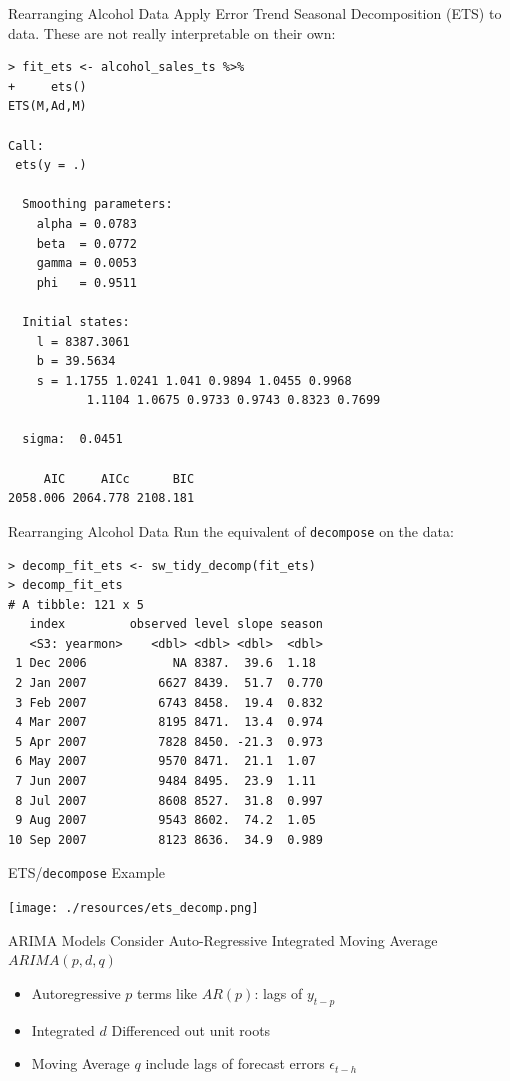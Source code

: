 \begin{frame}[fragile]{Rearranging Alcohol Data}
Apply \alert{Error Trend Seasonal} Decomposition (ETS) to data. These are not really interpretable on their own:
\tiny
\begin{verbatim}
> fit_ets <- alcohol_sales_ts %>%
+     ets()
ETS(M,Ad,M) 

Call:
 ets(y = .) 

  Smoothing parameters:
    alpha = 0.0783 
    beta  = 0.0772 
    gamma = 0.0053 
    phi   = 0.9511 

  Initial states:
    l = 8387.3061 
    b = 39.5634 
    s = 1.1755 1.0241 1.041 0.9894 1.0455 0.9968
           1.1104 1.0675 0.9733 0.9743 0.8323 0.7699

  sigma:  0.0451

     AIC     AICc      BIC 
2058.006 2064.778 2108.181 
\end{verbatim}
\end{frame}


\begin{frame}[fragile]{Rearranging Alcohol Data}
Run the equivalent of \texttt{decompose} on the data:
\footnotesize
\begin{verbatim}
> decomp_fit_ets <- sw_tidy_decomp(fit_ets)
> decomp_fit_ets 
# A tibble: 121 x 5
   index         observed level slope season
   <S3: yearmon>    <dbl> <dbl> <dbl>  <dbl>
 1 Dec 2006            NA 8387.  39.6  1.18 
 2 Jan 2007          6627 8439.  51.7  0.770
 3 Feb 2007          6743 8458.  19.4  0.832
 4 Mar 2007          8195 8471.  13.4  0.974
 5 Apr 2007          7828 8450. -21.3  0.973
 6 May 2007          9570 8471.  21.1  1.07 
 7 Jun 2007          9484 8495.  23.9  1.11 
 8 Jul 2007          8608 8527.  31.8  0.997
 9 Aug 2007          9543 8602.  74.2  1.05 
10 Sep 2007          8123 8636.  34.9  0.989
\end{verbatim}
\end{frame}



\begin{frame}{ETS/\texttt{decompose} Example}
\begin{center}
\texttt{[image: ./resources/ets\_decomp.png]}
\end{center}

\end{frame}

\begin{frame}{ARIMA Models}
Consider \alert{Auto-Regressive Integrated Moving Average} $ARIMA(p,d,q)$
\begin{itemize}
\item \alert{Autoregressive} $p$ terms like $AR(p)$: lags of $y_{t-p}$
\item \alert{Integrated} $d$ Differenced out unit roots 
\item \alert{Moving Average} $q$ include lags of forecast errors $\epsilon_{t-h}$
\end{itemize}
\end{frame}


